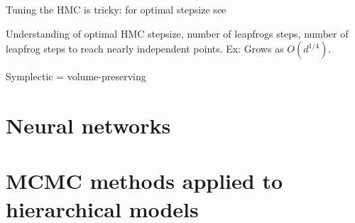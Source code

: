 \documentclass[]{report}
\begin{document}
Tuning the HMC is tricky: for optimal stepsize see \cite{beskos2013optimal}

Understanding of optimal HMC stepsize, number of leapfrogs steps, number of leapfrog steps to reach nearly independent points.
Ex: Grows as $O(d^{1/4})$.







Symplectic  = volume-preserving


\section{Neural networks} 



\section{MCMC methods applied to hierarchical models}
\end{document}
